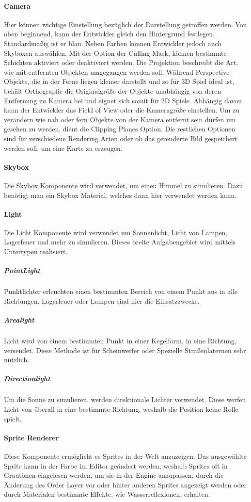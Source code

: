 \paragraph{Camera}
Hier können wichtige Einstellung bezüglich der Darstellung getroffen werden. Von oben beginnend, kann der Entwickler gleich den Hintergrund festlegen. Standardmäßig ist er blau. Neben Farben können Entwickler jedoch auch Skyboxen auswählen. Mit der Option der Culling Mask, können bestimmte Schichten aktiviert oder deaktiviert werden. Die Projektion beschreibt die Art, wie mit entfernten Objekten umgegangen werden soll. Während Perspective Objekte, die in der Ferne liegen kleiner darstellt und so für 3D Spiel ideal ist, behält Orthograpfic die Originalgröße der Objekte unabhängig von deren Entfernung zu Kamera bei und eignet sich somit für 2D Spiele. Abhängig davon kann der Entwickler das Field of View oder die Kameragröße einstellen. Um zu verändern wie nah oder fern Objekte von der Kamera entfernt sein dürfen um gesehen zu werden, dient die Clipping Planes Option. Die restlichen Optionen sind für verschiedene Rendering Arten oder ob das gerenderte Bild gespeichert werden soll, um eine Karte zu erzeugen.
\paragraph{Skybox}
Die Skybox Komponente wird verwendet, um einen Himmel zu simulieren. Dazu benötigt man ein Skybox Material, welches dann hier verwendet werden kann.
\paragraph{Light}
Die Licht Komponente wird verwendet um Sonnenlicht, Licht von Lampen, Lagerfeuer und mehr zu simulieren. Dieses breite Aufgabengebiet wird mittels Untertypen realisiert.
\subparagraph{PointLight}
Punktlichter erleuchten einen bestimmten Bereich von einem Punkt aus in alle Richtungen. Lagerfeuer oder Lampen sind hier die Einsatzzwecke.
\subparagraph{Arealight}
Licht wird von einem bestimmten Punkt in einer Kegelform, in eine Richtung, versendet. Diese Methode ist für Scheinwerfer oder Spezielle Straßenlaternen sehr nützlich.
\subparagraph{Directionlight}
Um die Sonne zu simulieren, werden direktionale Lichter verwendet. Diese werfen Licht von überall in eine bestimmte Richtung, weshalb die Position keine Rolle spielt. 
\paragraph{Sprite Renderer}
Diese Komponente ermöglicht es Sprites in der Welt anzuzeigen. Das ausgewählte Sprite kann in der Farbe im Editor geändert werden, weshalb Sprites oft in Grautönen eingelesen werden, um sie in der Engine anzupassen, durch die Änderung des Order Layer vor oder hinter anderen Sprites angezeigt werden oder durch Materialen bestimmte Effekte, wie Wasserreflexionen, erhalten.

